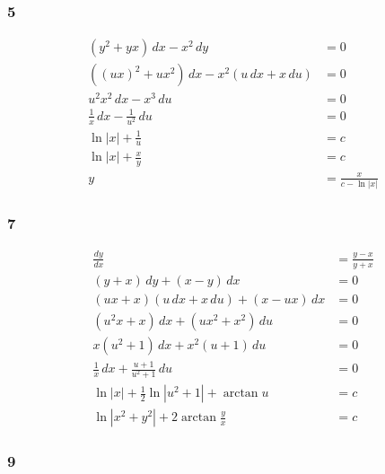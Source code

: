 \documentclass{article}
\begin{document}
\subsubsection{5}

\begin{align*}
  (y^2 + y x) \,dx - x^2 \,dy                    & = 0                     \\
  ((u x)^2 + u x^2) \,dx - x^2 (u \,dx + x \,du) & = 0                     \\
  u^2 x^2 \,dx - x^3 \,du                        & = 0                     \\
  \frac{1}{x} \,dx - \frac{1}{u^2} \,du          & = 0                     \\
  \ln |x| + \frac{1}{u}                          & = c                     \\
  \ln |x| + \frac{x}{y}                          & = c                     \\
  y                                              & = \frac{x}{c - \ln |x|}
\end{align*}

\subsubsection{7}

\begin{align*}
  \frac{dy}{dx}                                   & = \frac{y - x}{y + x} \\
  (y + x) \,dy + (x - y) \,dx                     & = 0                   \\
  (u x + x) (u \,dx + x \,du) + (x - u x) \,dx    & = 0                   \\
  (u^2 x + x) \,dx + (u x^2 + x^2) \,du           & = 0                   \\
  x (u^2 + 1) \,dx + x^2 (u + 1) \,du             & = 0                   \\
  \frac{1}{x} \,dx + \frac{u + 1}{u^2 + 1} \,du   & = 0                   \\
  \ln |x| + \frac{1}{2} \ln |u^2 + 1| + \arctan u & = c                   \\
  \ln |x^2 + y^2| + 2 \arctan \frac{y}{x}         & = c
\end{align*}

\subsubsection{9}
\end{document}
